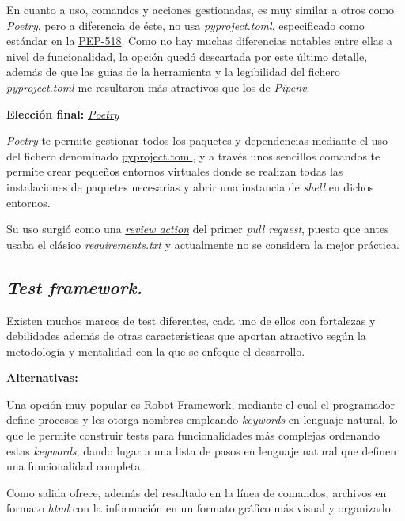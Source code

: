 En cuanto a uso, comandos y acciones gestionadas, es muy similar a otros como \textit{Poetry}, pero a diferencia de éste, no usa \textit{pyproject.toml}, especificado como estándar en la \href{https://peps.python.org/pep-0518/}{PEP-518}. Como no hay muchas diferencias notables entre ellas a nivel de funcionalidad, la opción quedó descartada por este último detalle, además de que las guías de la herramienta y la legibilidad del fichero \textit{pyproject.toml} me resultaron más atractivos que los de \textit{Pipenv}.

\textbf{Elección final:} \href{https://python-poetry.org/}{\textit{Poetry}}

\textit{Poetry} te permite gestionar todos los paquetes y dependencias mediante el uso del fichero denominado \href{https://github.com/Anglepi/My-Many-Reads/blob/main/pyproject.toml}{pyproject.toml}, y a través unos sencillos comandos te permite crear pequeños entornos virtuales donde se realizan todas las instalaciones de paquetes necesarias y abrir una instancia de \textit{shell} en dichos entornos.

Su uso surgió como una \href{https://github.com/Anglepi/My-Many-Reads/pull/39#discussion_r974230463}{\textit{review action}} del primer \textit{pull request}, puesto que antes usaba el clásico \textit{requirements.txt} y actualmente no se considera la mejor práctica.

\subsection{\textit{Test framework.}}

Existen muchos marcos de test diferentes, cada uno de ellos con fortalezas y debilidades además de otras características que aportan atractivo según la metodología y mentalidad con la que se enfoque el desarrollo.

\textbf{Alternativas:}

Una opción muy popular es \href{https://robotframework.org/}{Robot Framework}, mediante el cual el programador define procesos y les otorga nombres empleando \textit{keywords} en lenguaje natural, lo que le permite construir tests para funcionalidades más complejas ordenando estas \textit{keywords}, dando lugar a una lista de pasos en lenguaje natural que definen una funcionalidad completa.

Como salida ofrece, además del resultado en la línea de comandos, archivos en formato \textit{html} con la información en un formato gráfico más visual y organizado.

